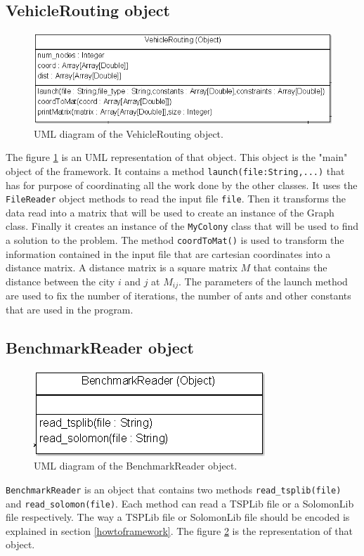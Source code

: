 \subsection{VehicleRouting object}\label{vrobject}
\begin{figure}
	\centering
		\includegraphics[scale = 0.5]{images/vehiclerouting.png}
	\caption{UML diagram of the VehicleRouting object.}
	\label{fig:vehiclerouting}
\end{figure}
The figure \ref{fig:vehiclerouting} is an UML representation of that object. This object is the "main" object of the framework.  It contains a method \texttt{launch(file:String,...)} that has for purpose of coordinating all the work done by the other classes. It uses the \texttt{FileReader} object methods to read the input file \texttt{file}. Then it transforms the data read into a matrix that will be used to create an instance of the Graph class. Finally it creates an instance of the \texttt{MyColony} class that will be used to find a solution to the problem. The method \texttt{coordToMat()} is used to transform the information contained in the input file that are cartesian coordinates into a distance matrix. A distance matrix is a square matrix $M$ that contains the distance between the city $i$ and $j$ at $M_{ij}$. The parameters of  the launch method are used to fix the number of iterations, the number of ants and other constants that are used in the program.

\subsection{BenchmarkReader object}
\begin{figure}
	\centering
		\includegraphics[scale = 0.5]{images/benchmarkreader.png}
	\caption{UML diagram of the BenchmarkReader object.}
	\label{fig:benchmarkreader}
\end{figure}
\texttt{BenchmarkReader} is an object that contains two methods \texttt{read\_tsplib(file)} and \texttt{read\_solomon(file)}. Each method can read a TSPLib file or a SolomonLib file respectively. The way a TSPLib file or SolomonLib file should be encoded is explained in section \ref{howtoframework}. The figure \ref{fig:benchmarkreader} is the representation of that object.

